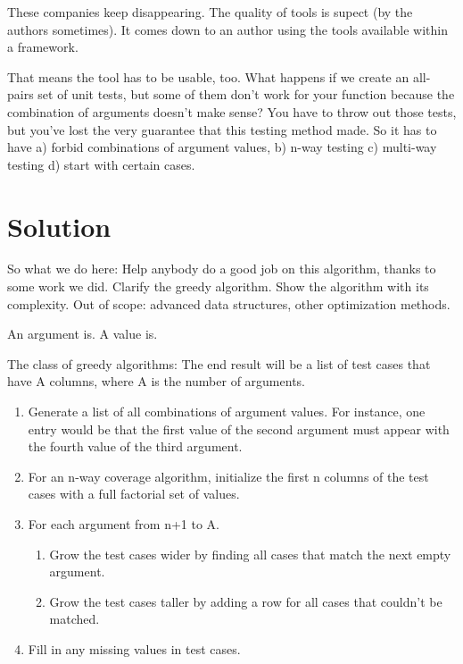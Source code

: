 \documentclass{juliacon}
\begin{document}
These companies keep disappearing. The quality of tools is supect (by the authors sometimes). It comes down to an author using the tools available within a framework.

That means the tool has to be usable, too. What happens if we create an all-pairs set of unit tests, but some of them don't work for your function because the combination of arguments doesn't make sense? You have to throw out those tests, but you've lost the very guarantee that this testing method made.
So it has to have a) forbid combinations of argument values, b) n-way testing c) multi-way testing d) start with certain cases.


\section{Solution}

So what we do here: Help anybody do a good job on this algorithm, thanks to some work we did.
Clarify the greedy algorithm. Show the algorithm with its complexity.
Out of scope: advanced data structures, other optimization methods.

An argument is. A value is.

The class of greedy algorithms:
The end result will be a list of test cases that have A columns, where A is the number of arguments.
\begin{enumerate}
   \item Generate a list of all combinations of argument values. For instance, one entry would be that the first value of the second argument must appear with the fourth value of the third argument.
   \item For an n-way coverage algorithm, initialize the first n columns of the test cases with a full factorial set of values.
   \item For each argument from n+1 to A.
   \begin{enumerate}
      \item Grow the test cases wider by finding all cases that match the next empty argument.
      \item Grow the test cases taller by adding a row for all cases that couldn't be matched.
   \end{enumerate}
   \item Fill in any missing values in test cases.
\end{enumerate}
\end{document}
